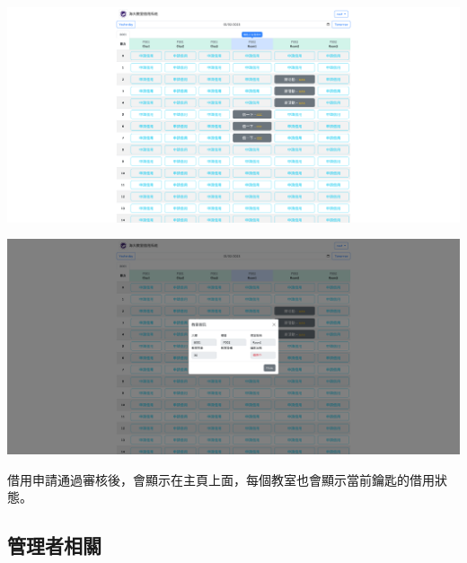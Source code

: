 \documentclass{article}
\begin{document}
\begin{center}
	\includegraphics[width=\linewidth]{HomePageWithBorrowing.png}

	\bigskip

	\includegraphics[width=\linewidth]{HomePageClassroomInfo.png}
\end{center}

借用申請通過審核後，會顯示在主頁上面，每個教室也會顯示當前鑰匙的借用狀態。

\pagebreak

\subsection{管理者相關}

\end{document}
